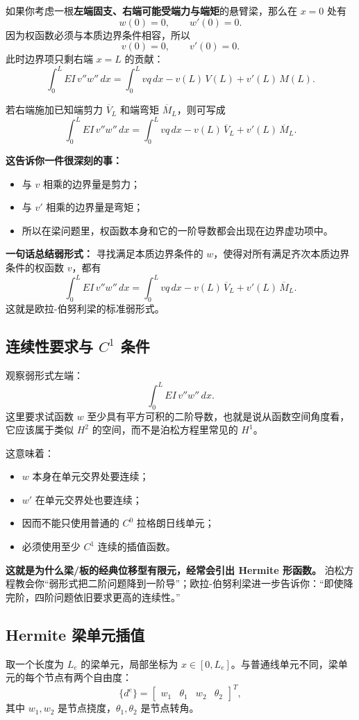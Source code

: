 \documentclass[11pt, a4paper, UTF8]{ctexart}
\begin{document}
如果你考虑一根\textbf{左端固支、右端可能受端力与端矩}的悬臂梁，那么在 $x=0$ 处有
\[
w(0)=0,\qquad w'(0)=0.
\]
因为权函数必须与本质边界条件相容，所以
\[
v(0)=0,\qquad v'(0)=0.
\]
此时边界项只剩右端 $x=L$ 的贡献：
\[
\int_0^L EI\, v'' w''\, dx
=
\int_0^L v q\, dx
- v(L)\,V(L) + v'(L)\,M(L).
\]

若右端施加已知端剪力 $\overline{V}_L$ 和端弯矩 $\overline{M}_L$，则可写成
\[
\int_0^L EI\, v'' w''\, dx
=
\int_0^L v q\, dx
- v(L)\,\overline{V}_L + v'(L)\,\overline{M}_L.
\]

\textbf{这告诉你一件很深刻的事：}
\begin{itemize}
    \item 与 $v$ 相乘的边界量是剪力；
    \item 与 $v'$ 相乘的边界量是弯矩；
    \item 所以在梁问题里，权函数本身和它的一阶导数都会出现在边界虚功项中。
\end{itemize}

\textbf{一句话总结弱形式：}
寻找满足本质边界条件的 $w$，使得对所有满足齐次本质边界条件的权函数 $v$，都有
\[
\int_0^L EI\, v'' w''\, dx
=
\int_0^L v q\, dx
- v(L)\,\overline{V}_L + v'(L)\,\overline{M}_L.
\]
这就是欧拉-伯努利梁的标准弱形式。

\subsection{连续性要求与 $C^1$ 条件}
观察弱形式左端：
\[
\int_0^L EI\, v'' w''\, dx.
\]
这里要求试函数 $w$ 至少具有平方可积的二阶导数，也就是说从函数空间角度看，它应该属于类似 $H^2$ 的空间，而不是泊松方程里常见的 $H^1$。

这意味着：
\begin{itemize}
    \item $w$ 本身在单元交界处要连续；
    \item $w'$ 在单元交界处也要连续；
    \item 因而不能只使用普通的 $C^0$ 拉格朗日线单元；
    \item 必须使用至少 $C^1$ 连续的插值函数。
\end{itemize}

\textbf{这就是为什么梁/板的经典位移型有限元，经常会引出 Hermite 形函数。}
泊松方程教会你“弱形式把二阶问题降到一阶导”；欧拉-伯努利梁进一步告诉你：“即使降完阶，四阶问题依旧要求更高的连续性。”

\subsection{Hermite 梁单元插值}
取一个长度为 $L_e$ 的梁单元，局部坐标为 $x\in[0,L_e]$。与普通线单元不同，梁单元的每个节点有两个自由度：
\[
\{d^e\} =
\begin{bmatrix}
w_1 & \theta_1 & w_2 & \theta_2
\end{bmatrix}^T,
\]
其中 $w_1,w_2$ 是节点挠度，$\theta_1,\theta_2$ 是节点转角。
\end{document}
